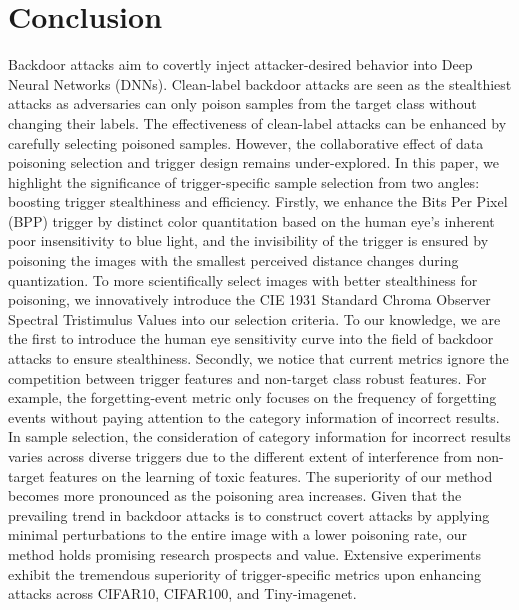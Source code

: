 \documentclass{article}
\begin{document}
\section{Conclusion}
Backdoor attacks aim to covertly inject attacker-desired behavior into Deep Neural Networks (DNNs). Clean-label backdoor attacks are seen as the stealthiest attacks as adversaries can only poison samples from the target class without changing their labels. The effectiveness of clean-label attacks can be enhanced by carefully selecting poisoned samples. However, the collaborative effect of data poisoning selection and trigger design remains under-explored. In this paper, we highlight the significance of trigger-specific sample selection from two angles: boosting trigger stealthiness and efficiency. Firstly, we enhance the Bits Per Pixel (BPP) trigger by distinct color quantitation based on the human eye's inherent poor insensitivity to blue light, and the invisibility of the trigger is ensured by poisoning the images with the smallest perceived distance changes during quantization. To more scientifically select images with better stealthiness for poisoning, we innovatively introduce the CIE 1931 Standard Chroma Observer Spectral Tristimulus Values into our selection criteria. To our knowledge, we are the first to introduce the human eye sensitivity curve into the field of backdoor attacks to ensure stealthiness. Secondly, we notice that current metrics ignore the competition between trigger features and non-target class robust features. For example, the forgetting-event metric only focuses on the frequency of forgetting events without paying attention to the category information of incorrect results. In sample selection, the consideration of category information for incorrect results varies across diverse triggers due to the different extent of interference from non-target features on the learning of toxic features. The superiority of our method becomes more pronounced as the poisoning area increases. Given that the prevailing trend in backdoor attacks is to construct covert attacks by applying minimal perturbations to the entire image with a lower poisoning rate, our method holds promising research prospects and value. Extensive experiments exhibit the tremendous superiority of trigger-specific metrics upon enhancing attacks across CIFAR10, CIFAR100, and Tiny-imagenet. 
 
\end{document}
